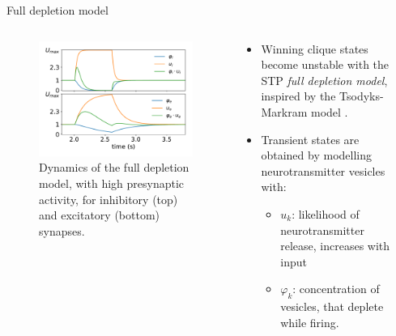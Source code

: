 \documentclass[final,hyperref={pdfpagelabels=false}]{beamer}
\begin{document}
\begin{frame}
\begin{columns}
\begin{column}{.30\textwidth}
\begin{minipage}[T]{.95\textwidth}
{	 	} %
		\end{minipage}
	\end{column}
	\hfil
	\begin{column}{.60\textwidth}
		\begin{minipage}[T]{.95\textwidth}
		\parbox[t][\columnheight]{\textwidth}{
		\vfil
		\begin{block}{Full depletion model}
			\begin{columns}
				\begin{column}[T]{.4\textwidth}
				\begin{figure}
					\includegraphics[width=.9\linewidth]{double_depletion_big.pdf}
					\caption{Dynamics of the full depletion model, with high presynaptic activity, for inhibitory (top) and excitatory (bottom) synapses.}
					\label{fig:full_depletion}
				\end{figure}
				\end{column}							
				\begin{column}[T]{.6\textwidth}
					\begin{itemize}
						\item Winning clique states become unstable with the STP \emph{full depletion model}, inspired by the Tsodyks-Markram model \cite{tsodyks2008model}.
						
						\item Transient states are obtained by modelling neurotransmitter vesicles with: 
						\begin{itemize}
							\item $u_k$: likelihood of neurotransmitter release, increases with input						
							\item $\varphi_k$: concentration of vesicles, that deplete while firing.
						\end{itemize}
						

\end{itemize}
\end{column}
\end{columns}
\end{block}}
\end{minipage}
\end{column}
\end{columns}
\end{frame}
\end{document}
